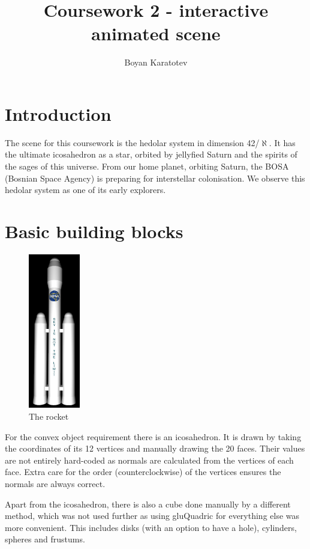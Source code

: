 \documentclass[10pt]{article}
\title{Coursework 2 - interactive animated scene}
\author{Boyan Karatotev}
\date{}
\begin{document}
    \maketitle

    \section{Introduction}

        The scene for this coursework is the hedolar system in dimension
        42/$\aleph$. It has the ultimate icosahedron as a star, orbited by
        jellyfied Saturn and the spirits of the sages of this universe. From
        our home planet, orbiting Saturn, the BOSA (Bosnian Space Agency) is
        preparing for interstellar colonisation. We observe this hedolar system
        as one of its early explorers.


    \section{Basic building blocks}
        \begin{figure}
            \caption{The rocket}
            \includegraphics[width=0.2\textwidth]{rocket}
        \end{figure}


        For the convex object requirement there is an icosahedron. It is drawn
        by taking the coordinates of its 12 vertices and manually drawing the
        20 faces. Their values are not entirely hard-coded as normals are
        calculated from the vertices of each face. Extra care for the order
        (counterclockwise) of the vertices ensures the normals are always
        correct.

        Apart from the icosahedron, there is also a cube done manually by a
        different method, which was not used further as using gluQuadric for
        everything else was more convenient. This includes disks (with an
        option to have a hole), cylinders, spheres and frustums.
\end{document}
